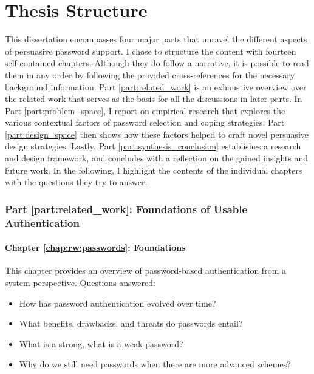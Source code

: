 \section{Thesis Structure}
This dissertation encompasses four major parts that unravel the different aspects of persuasive password support. I chose to structure the content with fourteen self-contained chapters. Although they do follow a narrative, it is possible to read them in any order by following the provided cross-references for the necessary background information. Part \ref{part:related_work} is an exhaustive overview over the related work that serves as the basis for all the discussions in later parts. In Part \ref{part:problem_space}, I report on empirical research that explores the various contextual factors of password selection and coping strategies. Part \ref{part:design_space} then shows how these factors helped to craft novel persuasive design strategies. Lastly, Part \ref{part:synthesis_conclusion} establishes a research and design framework, and concludes with a reflection on the gained insights and future work. In the following, I highlight the contents of the individual chapters with the questions they try to answer.


\subsubsection{Part \ref{part:related_work}: Foundations of Usable Authentication}

\paragraph{Chapter \ref{chap:rw:passwords}: Foundations} %
This chapter provides an overview of password-based authentication from a system-perspective. 
Questions answered: \vspace*{-5pt} \begin{itemize}[leftmargin=*,itemsep=-5pt]
	\item How has password authentication evolved over time?
	\item What benefits, drawbacks, and threats do passwords entail?
	\item What is a strong, what is a weak password?
	\item Why do we still need passwords when there are more advanced schemes?
\end{itemize}

